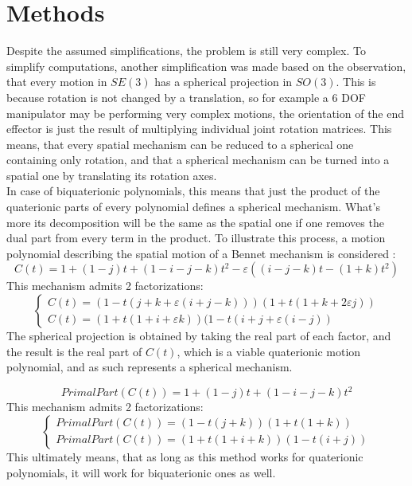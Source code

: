 \section{Methods}
Despite the assumed simplifications, the problem is still very complex.
To simplify computations, another simplification was made based on the observation, that every motion in $SE(3)$ has a spherical projection in  $SO(3)$. This is because rotation is not changed by a translation, so for example a 6 DOF manipulator may be performing very complex motions, the orientation of the end effector is just the result of multiplying individual joint rotation matrices. 
This means, that every spatial mechanism can be reduced to a spherical one containing only rotation, and that a spherical mechanism can be turned into a spatial one by translating its rotation axes.\\
In case of biquaterionic polynomials, this means that just the product of
the quaterionic parts of every polynomial defines a spherical mechanism. What's more its decomposition will be the same as the spatial one if one removes the dual part from every term in the product. To illustrate this process, a motion polynomial describing the spatial motion of a Bennet mechanism is considered\cite{li2015factorization} :
\begin{equation}
    C(t) = 1 +  (1-j)t + (1-i-j-k)t^{2} - \varepsilon((i-j-k)t-(1+k)t^{2})
\end{equation}
This mechanism admits 2 factorizations:
\begin{equation}
    \begin{cases}
        C(t) = (1-t(j+k+\varepsilon(i+j-k)))(1+t(1+k+2\varepsilon j ))\\
        C(t) = (1+t(1+i+\varepsilon k))(1-t(i+j+\varepsilon(i-j))
    \end{cases}
\end{equation}
The spherical projection is obtained by taking the real part of each factor, and the result is the real part of $C(t)$, which is a viable quaterionic motion polynomial, and as such represents a spherical mechanism.

\begin{equation}
    PrimalPart(C(t)) = 1 +  (1-j)t + (1-i-j-k)t^{2}
\end{equation}
This mechanism admits 2 factorizations:
\begin{equation}
    \begin{cases}
        PrimalPart(C(t)) = (1-t(j+k))(1+t(1+k))\\
        PrimalPart(C(t)) = (1+t(1+i+k))(1-t(i+j))
    \end{cases}
\end{equation}
This ultimately means, that as long as this method works for quaterionic polynomials, it will work for biquaterionic ones as well.

